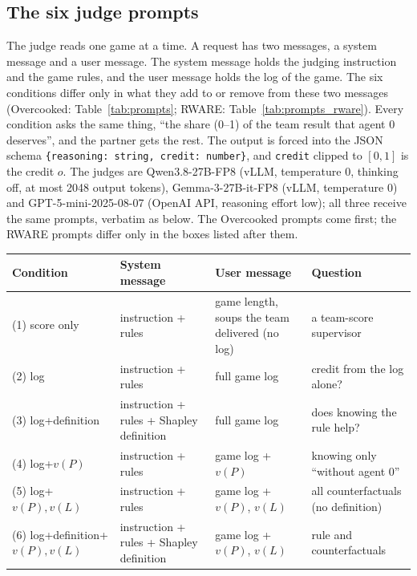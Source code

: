 \documentclass[letterpaper]{article} %
\begin{document}
\subsection{The six judge prompts}
\label{app:prompts}
The judge reads one game at a time. A request has two messages, a system message and a user message. The system
message holds the judging instruction and the game rules, and the user message holds the log of the game. The six
conditions differ only in what they add to or remove from these two messages (Overcooked: Table~\ref{tab:prompts};
RWARE: Table~\ref{tab:prompts_rware}). Every
condition asks the same thing, ``the share (0--1) of the team result that agent 0 deserves'', and the partner gets
the rest. The output is forced into the JSON schema \texttt{\{reasoning: string, credit: number\}}, and
\texttt{credit} clipped to $[0,1]$ is the credit $o$. The judges are Qwen3.8-27B-FP8 (vLLM, temperature 0, thinking
off, at most 2048 output tokens), Gemma-3-27B-it-FP8 (vLLM, temperature 0) and GPT-5-mini-2025-08-07 (OpenAI API,
reasoning effort low); all three receive the same prompts, verbatim as below. The
Overcooked prompts come first; the RWARE prompts differ only in the boxes listed after them.

\par\medskip\noindent\begin{minipage}{\textwidth}
\centering
\footnotesize
\setlength{\tabcolsep}{4pt}
\begin{tabular}{@{}p{4.3cm}p{3.9cm}p{4.3cm}p{4.6cm}@{}}
\toprule
Condition & System message & User message & Question \\
\midrule
(1) score only & instruction + rules & game length, soups the team delivered (no log) & a team-score supervisor \\
(2) log & instruction + rules & full game log & credit from the log alone? \\
(3) log+definition & instruction + rules + Shapley definition & full game log & does knowing the rule help? \\
(4) log+$v(P)$ & instruction + rules & game log + $v(P)$ & knowing only ``without agent 0'' \\
(5) log+$v(P),v(L)$ & instruction + rules & game log + $v(P)$, $v(L)$ & all counterfactuals (no definition) \\
(6) log+definition+$v(P),v(L)$ & instruction + rules + Shapley definition & game log + $v(P)$, $v(L)$ & rule and counterfactuals \\
\bottomrule
\end{tabular}
\label{tab:prompts}
\end{minipage}\par\medskip
\end{document}
